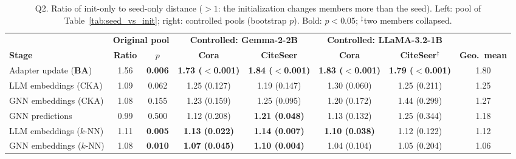 \documentclass[a4paper,fleqn]{cas-sc}
\begin{document}
\begin{table}[t]
\centering\color{revshared}
\caption{Q2. Ratio of init-only to seed-only distance ($>1$: the initialization changes members more than the seed). Left: pool of Table~\ref{tab:seed_vs_init}; right: controlled pools (bootstrap $p$). Bold: $p<0.05$; $^\ddagger$two members collapsed.}
\label{tab:q2}
\footnotesize
\setlength{\tabcolsep}{3pt}
\begin{tabular*}{\textwidth}{@{\extracolsep{\fill}} lcc|cc|cc|c @{}}
\toprule
 & \multicolumn{2}{c|}{\textbf{Original pool}} & \multicolumn{2}{c|}{\textbf{Controlled: Gemma-2-2B}} & \multicolumn{2}{c|}{\textbf{Controlled: LLaMA-3.2-1B}} & \\
\textbf{Stage} & \textbf{Ratio} & \textbf{$p$} & \textbf{Cora} & \textbf{CiteSeer} & \textbf{Cora} & \textbf{CiteSeer}$^\ddagger$ & \textbf{Geo.\ mean} \\
\midrule
Adapter update ($\mathbf{B}\mathbf{A}$) & 1.56 & \textbf{0.006} & \textbf{1.73 ($<$0.001)} & \textbf{1.84 ($<$0.001)} & \textbf{1.83 ($<$0.001)} & \textbf{1.79 ($<$0.001)} & 1.80 \\
LLM embeddings (CKA)   & 1.09 & 0.062 & 1.25 (0.127) & 1.19 (0.147) & 1.30 (0.060) & 1.25 (0.211) & 1.25 \\
GNN embeddings (CKA)   & 1.08 & 0.155 & 1.23 (0.159) & 1.25 (0.095) & 1.20 (0.172) & 1.44 (0.299) & 1.27 \\
GNN predictions        & 0.99 & 0.500 & 1.12 (0.208) & \textbf{1.21 (0.048)} & 1.13 (0.132) & 1.25 (0.344) & 1.18 \\
\midrule
LLM embeddings ($k$-NN) & 1.11 & \textbf{0.005} & \textbf{1.13 (0.022)} & \textbf{1.14 (0.007)} & \textbf{1.10 (0.038)} & 1.12 (0.122) & 1.12 \\
GNN embeddings ($k$-NN) & 1.08 & \textbf{0.010} & \textbf{1.07 (0.045)} & \textbf{1.10 (0.004)} & 1.04 (0.104) & 1.05 (0.204) & 1.06 \\
\bottomrule
\end{tabular*}
\end{table}
\end{document}
